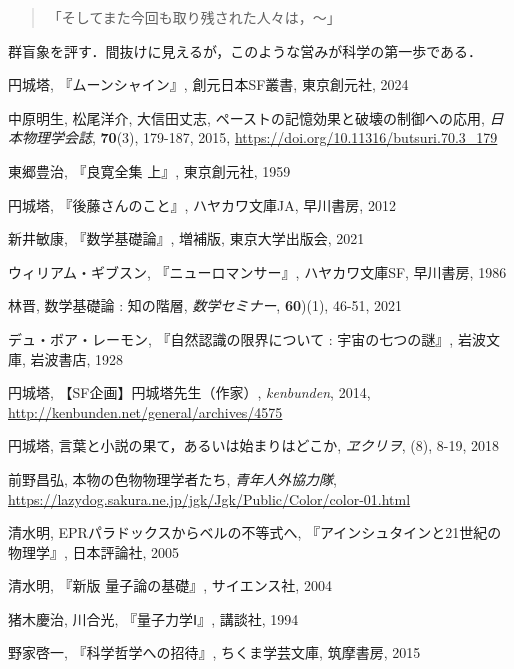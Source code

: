 \documentclass[10pt, a5paper, twoside]{jsarticle}
\theoremstyle{definition}
\begin{document}
			\begin{quote}

				「そしてまた今回も取り残された人々は，〜」
				
			\end{quote}

			群盲象を評す．間抜けに見えるが，このような営みが科学の第一歩である．

		\clearpage

	\begin{thebibliography}{99}

		 円城塔, 『ムーンシャイン』, 創元日本SF叢書, 東京創元社, 2024

		 中原明生, 松尾洋介, 大信田丈志, ペーストの記憶効果と破壊の制御への応用, \textit{日本物理学会誌}, \textbf{70}(3), 179-187, 2015, \url{https://doi.org/10.11316/butsuri.70.3_179}

		 東郷豊治, 『良寛全集 上』, 東京創元社, 1959

		 円城塔, 『後藤さんのこと』, ハヤカワ文庫JA, 早川書房, 2012

		 新井敏康, 『数学基礎論』, 増補版, 東京大学出版会, 2021

		 ウィリアム・ギブスン, 『ニューロマンサー』, ハヤカワ文庫SF, 早川書房, 1986

		 林晋, 数学基礎論 : 知の階層, \textit{数学セミナー}, \textbf{60})(1), 46-51, 2021

		 デュ・ボア・レーモン, 『自然認識の限界について : 宇宙の七つの謎』, 岩波文庫, 岩波書店, 1928

		 円城塔, 【SF企画】円城塔先生（作家）, \textit{kenbunden}, 2014, \url{http://kenbunden.net/general/archives/4575}

		 円城塔, 言葉と小説の果て，あるいは始まりはどこか, \textit{ヱクリヲ}, (8), 8-19, 2018

		 前野昌弘, 本物の色物物理学者たち, \textit{青年人外協力隊}, \url{https://lazydog.sakura.ne.jp/jgk/Jgk/Public/Color/color-01.html}

		 清水明, EPRパラドックスからベルの不等式へ, 『アインシュタインと21世紀の物理学』, 日本評論社, 2005

		 清水明, 『新版 量子論の基礎』, サイエンス社, 2004

		 猪木慶治, 川合光, 『量子力学Ⅰ』, 講談社, 1994

		 野家啓一, 『科学哲学への招待』, ちくま学芸文庫, 筑摩書房, 2015


\end{thebibliography}
\end{document}
